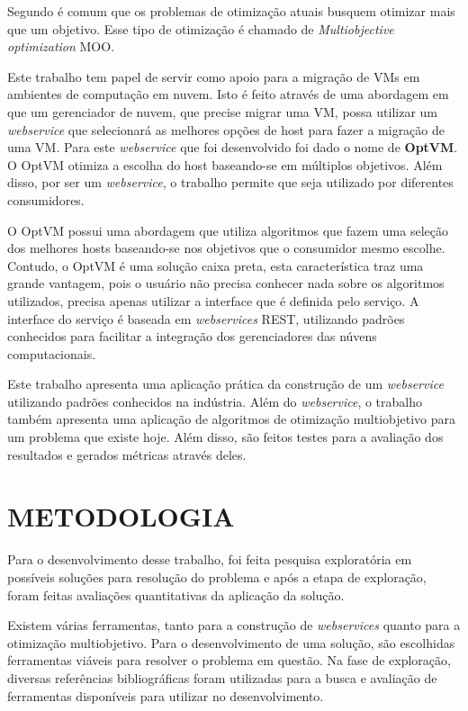Segundo \cite{ticona} é comum que os problemas de otimização 
atuais busquem otimizar mais que um objetivo. Esse tipo de 
otimização é chamado de \textit{Multiobjective optimization} MOO. 

Este trabalho tem papel de servir como apoio para a migração de VMs em ambientes de computação em nuvem. 
Isto é feito através de uma abordagem em que um gerenciador de nuvem, que precise migrar uma VM, possa 
utilizar um \textit{webservice} que selecionará as melhores opções de host para fazer a migração de uma VM. 
Para este \textit{webservice}  que foi desenvolvido foi dado o nome de \textbf{OptVM}.
O OptVM otimiza a escolha do host baseando-se em múltiplos objetivos.
Além disso, por ser um \textit{webservice}, o trabalho permite que seja utilizado por 
diferentes consumidores. 

O OptVM possui uma abordagem que utiliza algoritmos que fazem uma seleção dos melhores hosts baseando-se 
nos objetivos que o consumidor mesmo escolhe. Contudo, o OptVM é uma solução caixa preta, esta característica 
traz uma grande vantagem, pois o usuário não precisa conhecer nada sobre os algoritmos utilizados, 
precisa apenas utilizar a interface que é definida pelo serviço. A interface do serviço é baseada em
\textit{webservices} REST, utilizando padrões conhecidos para facilitar a integração dos gerenciadores
das núvens computacionais.

Este trabalho apresenta uma aplicação prática da construção de um \textit{webservice} utilizando padrões conhecidos
na indústria. Além do \textit{webservice}, o trabalho também apresenta uma aplicação de algoritmos de otimização multiobjetivo
para um problema que existe hoje. Além disso, são feitos testes para a avaliação dos resultados e gerados métricas através deles.

\section{METODOLOGIA}

Para o desenvolvimento desse trabalho, foi feita pesquisa exploratória em possíveis
soluções para resolução do problema e após a etapa de exploração, foram feitas
avaliações quantitativas da aplicação da solução.

Existem várias ferramentas, tanto para a construção de \textit{webservices} quanto
para a otimização multiobjetivo. Para o desenvolvimento de uma solução, 
são escolhidas ferramentas viáveis para resolver o problema em questão.
Na fase de exploração, diversas referências bibliográficas foram utilizadas para 
a busca e avaliação de ferramentas disponíveis para utilizar no desenvolvimento. 

